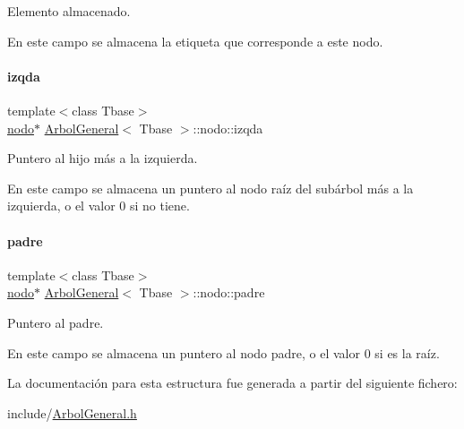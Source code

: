 Elemento almacenado. 

En este campo se almacena la etiqueta que corresponde a este nodo. \hypertarget{structArbolGeneral_1_1nodo_a3b8075b9fd0dc27c2272ba48bd9a9221}{}\label{structArbolGeneral_1_1nodo_a3b8075b9fd0dc27c2272ba48bd9a9221} 
\paragraph{\texorpdfstring{izqda}{izqda}}
{\footnotesize\ttfamily template$<$class Tbase$>$ \\
\hyperlink{structArbolGeneral_1_1nodo}{nodo}$\ast$ \hyperlink{classArbolGeneral}{Arbol\+General}$<$ Tbase $>$\+::nodo\+::izqda}



Puntero al hijo más a la izquierda. 

En este campo se almacena un puntero al nodo raíz del subárbol más a la izquierda, o el valor 0 si no tiene. \hypertarget{structArbolGeneral_1_1nodo_ab4d70a0179e8450b2842bbf1a6481402}{}\label{structArbolGeneral_1_1nodo_ab4d70a0179e8450b2842bbf1a6481402} 
\paragraph{\texorpdfstring{padre}{padre}}
{\footnotesize\ttfamily template$<$class Tbase$>$ \\
\hyperlink{structArbolGeneral_1_1nodo}{nodo}$\ast$ \hyperlink{classArbolGeneral}{Arbol\+General}$<$ Tbase $>$\+::nodo\+::padre}



Puntero al padre. 

En este campo se almacena un puntero al nodo padre, o el valor 0 si es la raíz. 

La documentación para esta estructura fue generada a partir del siguiente fichero\+:\begin{DoxyCompactItemize}
\item 
include/\hyperlink{ArbolGeneral_8h}{Arbol\+General.\+h}\end{DoxyCompactItemize}
